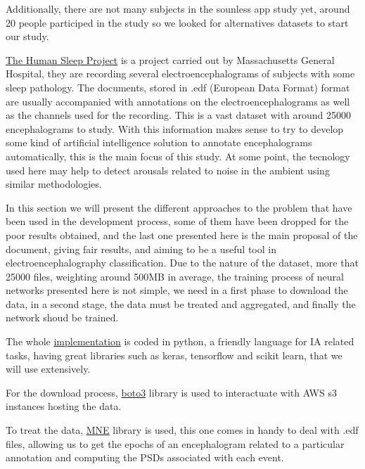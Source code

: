 Additionally, there are not many subjects in the sounless app study yet, around 20 people participed in the study so we looked for alternatives datasets to start our study.

\href{https://bdsp.io/content/hsp/2.0/}{The Human Sleep Project} is a project carried out by Massachusetts General Hospital, they are recording several electroencephalograms of subjects with some sleep pathology. The documents, stored in .edf (European Data Format) format are usually accompanied with annotations on the electroencephalograms as well as the channels used for the recording. This is a vast dataset with around 25000 encephalograms to study. With this information makes sense to try to develop some kind of artificial intelligence solution to annotate encephalograms automatically, this is the main focus of this study. At some point, the tecnology used here may help to detect arousals related to noise in the ambient using similar methodologies. 


\blindtext

In this section we will present the different approaches to the problem that have been used in the development process, some of them have been dropped for the poor results obtained, and the last one presented here is the main proposal of the document, giving fair results, and aiming to be a useful tool in electroencephalography classification. Due to the nature of the dataset, more that 25000 files, weighting around 500MB in average, the training process of neural networks presented here is not simple, we need in a first phase to download the data, in a second stage, the data must be treated and aggregated, and finally the network shoud be trained.

The whole \href{https://github.com/szz-dvl/soundless/tree/main}{implementation} is coded in python, a friendly language for IA related tasks, having great libraries such as keras, tensorflow and scikit learn, that we will use extensively.

For the download process, \href{https://pypi.org/project/boto3/}{boto3} library is used to interactuate with AWS s3 instances hosting the data.

To treat the data, \href{https://mne.tools/stable/index.html}{MNE} library is used, this one comes in handy to deal with .edf files, allowing us to get the epochs of an encephalogram related to a particular annotation and computing the PSDs associated with each event.


